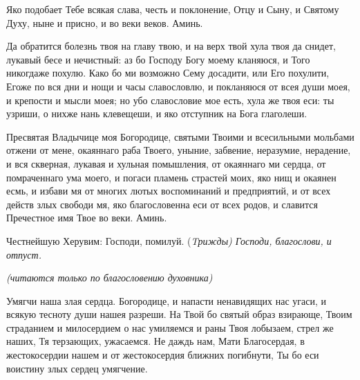 Яко подобает Тебе всякая слава, честь и поклонение, Отцу и Сыну, и Святому Духу, ныне и присно, и во веки веков. Аминь.




Да обратится болезнь твоя на главу твою, и на верх твой хула твоя да снидет, лукавый бесе и нечистный: аз бо Господу Богу моему кланяюся, и Того никогдаже похулю. Како бо ми возможно Сему досадити, или Его похулити, Егоже по вся дни и нощи и часы славословлю, и покланяюся от всея души моея, и крепости и мысли моея; но убо славословие мое есть, хула же твоя еси: ты узриши, о нихже нань клевещеши, и яко отступник на Бога глаголеши.




Пресвятая Владычице моя Богородице, святыми Твоими и всесильными мольбами отжени от мене, окаяннаго раба Твоего, уныние, забвение, неразумие, нерадение, и вся скверная, лукавая и хульная помышления, от окаяннаго ми сердца, от помраченнаго ума моего, и погаси пламень страстей моих, яко нищ и окаянен есмь, и избави мя от многих лютых воспоминаний и предприятий, и от всех действ злых свободи мя, яко благословенна еси от всех родов, и славится Пречестное имя Твое во веки. Аминь.

Честнейшую Херувим: Господи, помилуй. (\itshape Tрижды\normalfont{}) Господи, благослови, \itshape и отпуст.\normalfont{}
\mychapterending

 


\itshape (читаются только по благословению духовника)\normalfont{}




Умягчи наша злая сердца. Богородице, и напасти ненавидящих нас угаси, и всякую тесноту души нашея разреши. На Твой бо святый образ взирающе, Твоим страданием и милосердием о нас умиляемся и раны Твоя лобызаем, стрел же наших, Тя терзающих, ужасаемся. Не даждь нам, Мати Благосердая, в жестокосердии нашем и от жестокосердия ближних погибнути, Ты бо еси воистину злых сердец умягчение.
\mychapterending
